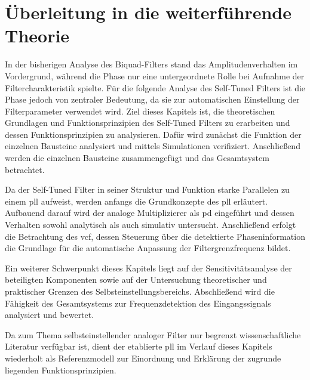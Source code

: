 \documentclass[../main.tex]{subfiles}
\begin{document}
\section{Überleitung in die weiterführende Theorie}

In der bisherigen Analyse des Biquad-Filters stand das Amplitudenverhalten im Vordergrund, während die Phase nur eine untergeordnete Rolle bei Aufnahme der Filtercharakteristik spielte. Für die folgende Analyse des Self-Tuned Filters ist die Phase jedoch von zentraler Bedeutung, da sie zur automatischen Einstellung der Filterparameter verwendet wird. Ziel dieses Kapitels ist, die theoretischen Grundlagen und Funktionsprinzipien des Self-Tuned Filters zu erarbeiten und dessen Funktionsprinzipien zu analysieren. Dafür wird zunächst die Funktion der einzelnen Bausteine analysiert und mittels Simulationen verifiziert. Anschließend werden die einzelnen Bausteine zusammengefügt und das Gesamtsystem betrachtet.\par
\medskip
Da der Self-Tuned Filter in seiner Struktur und Funktion starke Parallelen zu einem \gls{pll} aufweist, werden anfangs die Grundkonzepte des \gls{pll} erläutert. Aufbauend darauf wird der analoge Multiplizierer als \gls{pd} eingeführt und dessen Verhalten sowohl analytisch als auch simulativ untersucht. Anschließend erfolgt die Betrachtung des \gls{vcf}, dessen Steuerung über die detektierte Phaseninformation die Grundlage für die automatische Anpassung der Filtergrenzfrequenz bildet.\par
\medskip
Ein weiterer Schwerpunkt dieses Kapitels liegt auf der Sensitivitätsanalyse der beteiligten Komponenten sowie auf der Untersuchung theoretischer und praktischer Grenzen des Selbsteinstellungsbereichs. Abschließend wird die Fähigkeit des Gesamtsystems zur Frequenzdetektion des Eingangssignals analysiert und bewertet.\par
\medskip
Da zum Thema selbsteinstellender analoger Filter nur begrenzt wissenschaftliche Literatur verfügbar ist, dient der etablierte \gls{pll} im Verlauf dieses Kapitels wiederholt als Referenzmodell zur Einordnung und Erklärung der zugrunde liegenden Funktionsprinzipien.
\end{document}
